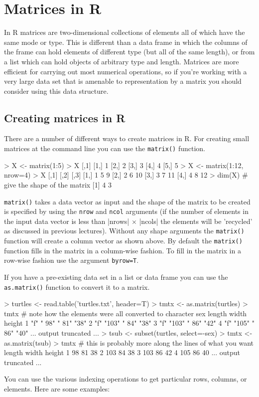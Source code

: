 
\section{Matrices in R}

In R matrices are two-dimensional collections of elements all of which
have the same mode or type. This is different than a data frame in which
the columns of the frame can hold elements of different type (but all of
the same length), or from a list which can hold objects of arbitrary
type and length. Matrices are more efficient for carrying out most
numerical operations, so if you're working with a very large data set
that is amenable to representation by a matrix you should consider using
this data structure.

\subsection{Creating matrices in R}

There are a number of different ways to create matrices in R. For
creating small matrices at the command line you can use the
\lstinline!matrix()! function.

\begin{R}
> X <- matrix(1:5)
> X
      [,1]
 [1,]    1
 [2,]    2
 [3,]    3
 [4,]    4
 [5,]    5
> X <- matrix(1:12, nrow=4)
> X
     [,1] [,2] [,3]
[1,]    1    5    9
[2,]    2    6   10
[3,]    3    7   11
[4,]    4    8   12
> dim(X) # give the shape of the matrix
[1] 4 3
\end{R}
\lstinline!matrix()! takes a data vector as input and the shape of the
matrix to be created is specified by using the \lstinline!nrow! and
\lstinline!ncol! arguments (if the number of elements in the input data
vector is less than |nrows| $\times$ |ncols| the
elements will be 'recycled' as discussed in previous lectures). Without
any shape arguments the \lstinline!matrix()! function will create a
column vector as shown above. By default the \lstinline!matrix()!
function fills in the matrix in a column-wise fashion. To fill in the
matrix in a row-wise fashion use the argument \lstinline!byrow=T!.

If you have a pre-existing data set in a list or data frame you can use
the \lstinline!as.matrix()! function to convert it to a matrix.

\begin{R}
> turtles <- read.table('turtles.txt', header=T)
> tmtx <- as.matrix(turtles)
> tmtx   # note how the elements were all converted to character
   sex length width height
1  "f" " 98"  " 81" "38"
2  "f" "103"  " 84" "38"
3  "f" "103"  " 86" "42"
4  "f" "105"  " 86" "40"
 ... output truncated ...
> tsub <- subset(turtles, select=-sex)
> tmtx <- as.matrix(tsub)
> tmtx    # this is probably more along the lines of what you want
   length width height
1      98    81     38
2     103    84     38
3     103    86     42
4     105    86     40
 ... output truncated ...
\end{R}
You can use the various indexing operations to get particular rows,
columns, or elements. Here are some examples:

